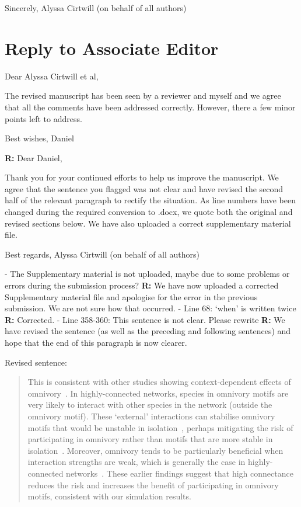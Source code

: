 \documentclass[12pt]{article}
\newenvironment{refquote}{\bigskip \begin{it}}{\end{it}\medskip}
\begin{document}
    Sincerely,
    Alyssa Cirtwill (on behalf of all authors)

\clearpage


\section*{Reply to Associate Editor}

    \begin{refquote}
    Dear Alyssa Cirtwill et al,

    The revised manuscript has been seen by a reviewer and myself and we agree that all the comments have been addressed correctly. However, there a few minor points left to address.

    Best wishes,
    Daniel
    \end{refquote}


    \textbf{R:} Dear Daniel,

    Thank you for your continued efforts to help us improve the manuscript. We agree that the sentence you flagged was not clear and have revised the second half of the relevant paragraph to rectify the situation. As line numbers have been changed during the required conversion to .docx, we quote both the original and revised sections below. We have also uploaded a correct supplementary material file. 

    Best regards,
    Alyssa Cirtwill (on behalf of all authors)


    - The Supplementary material is not uploaded, maybe due to some problems or errors during the submission process?
    \textbf{R:} We have now uploaded a corrected Supplementary material file and apologise for the error in the previous submission. We are not sure how that occurred.
    - Line 68: ‘when’ is written twice
    \textbf{R:} Corrected.
    - Line 358-360: This sentence is not clear. Please rewrite
    \textbf{R:} We have revised the sentence (as well as the preceding and following sentences) and hope that the end of this paragraph is now clearer.

    Revised sentence:
    \begin{quotation}
    This is consistent with other studies showing context-dependent effects of omnivory~\citep{Bascompte2005,Monteiro2016}.
    In highly-connected networks, species in omnivory motifs are very likely to interact with other species in the network (outside the omnivory motif).
    These `external' interactions can stabilise omnivory motifs that would be unstable in isolation~\citep{Kratina2012}, perhaps mitigating the risk of participating in omnivory rather than motifs that are more stable in isolation~\citep{Borrelli2015a}.
    Moreover, omnivory tends to be particularly beneficial when interaction strengths are weak, which is generally the case in highly-connected networks~\citep{Emmerson2004}.
    These earlier findings suggest that high connectance reduces the risk and increases the benefit of participating in omnivory motifs, consistent with our simulation results.

    \end{quotation}
\end{document}
